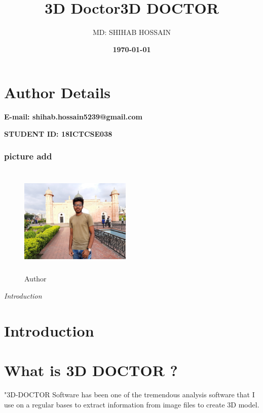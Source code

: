 \documentclass{article}
\title{3D Doctor}
\title{\textbf{3D DOCTOR}}
\author{MD: SHIHAB HOSSAIN}
\begin{document}
\maketitle
\section{Author Details }
\begin{LARGE}
\begin{flushleft}
\textbf{E-mail: shihab.hossain5239@gmail.com}\\
\end{flushleft}
\begin{flushleft}
\textbf{STUDENT ID: 18ICTCSE038}\\
\end{flushleft}
\date\textbf{\today}
\end{LARGE}
\subsubsection{picture add}
\noindent
\begin{figure}[h]
\centering
\includegraphics[width=200px,height=200px]{k.jpg}
\caption{Author}
\label{shihab}
\end{figure}
\newpage
\maketitle
\begin{huge}
\begin{center}
\textit{Introduction}
\end{center}
\end{huge}
\tableofcontents
\newpage
\section{Introduction}
\section{\textbf{What is 3D DOCTOR ?}}
"3D-DOCTOR Software has been one of the tremendous analysis software that I use on a regular bases to extract information from image files to create 3D model.
\end{document}
